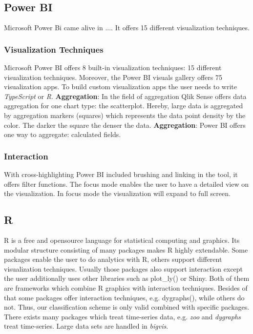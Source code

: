 \subsection{Power BI}
Microsoft Power Bi came alive in .... It offers 15 different visualization techniques. 

\subsubsection*{Visualization Techniques}
Microsoft Power BI offers 8 built-in visualization techniques: 15 different visualization techniques. Moreover, the Power BI visuals gallery offers 75 visualization apps. To build custom visualization apps the user needs to write \textit{TypeScript} or \textit{R}.
\textbf{Aggregation}: In the field of aggregation Qlik Sense offers data aggregation for one chart type: the scatterplot. Hereby, large data is aggregated by aggregation markers (squares) which represents the data point density by the color. The darker the square the denser the data\cite{qlikScatter}. 
\textbf{Aggregation}: Power BI offers one way to aggregate: calculated fields.
\subsubsection*{Interaction}
With cross-highlighting Power BI included brushing and linking in the tool\cite{powerbiInteract}, it offers filter functions. The focus mode enables the user to have a detailed view on the visualization. In focus mode the visualization will expand to full screen.  

\subsection{R}
R is a free and opensource language for statistical computing and graphics. Its modular structure consisting of many packages makes R highly extendable\cite{R}. Some packages enable the user to do analytics with R, others support different visualization techniques. Usually those packages also support interaction except the user additionally uses other libraries such as plot\_ly() or Shiny. Both of them are frameworks which combine R graphics with interaction techniques. Besides of that some packages offer interaction techniques, e.g. dygraphs(), while others do not. Thus, our classification scheme is only valid combined with specific packages.
There exists many packages which treat time-series data, e.g. \textit{zoo} and \textit{dygraphs} treat time-series. Large data sets are handled in \textit{bigvis}.
